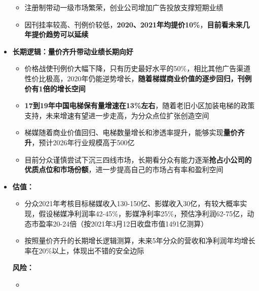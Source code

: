\begin{itemize}[leftmargin=*]
{\begin{itemize}
        \item 注册制带动一级市场繁荣，创业公司增加广告投放支撑短期业绩
        \item 因刊挂率较高、刊例价较低，\textbf{2020、2021年均提价10\%}，\textbf{目前看未来几年提价趋势可以延续}
      \end{itemize}
      }
    \item
      \textbf{长期逻辑：量价齐升带动业绩长期向好}
      {\small
      \begin{itemize}
        \item 价格战使刊例价大幅下降，只有历史最好水平的50\%，相比其他广告渠道性价比极高，2020年仍能逆势增长，\textbf{随着梯媒商业价值的逐步回归，刊例价有1倍的增长空间}
        \item \textbf{17到19年中国电梯保有量增速在13\%左右}，随着老旧小区加装电梯的政策支持，未来增速有望进一步走高，为分众点位扩张创造空间
        \item 梯媒随着商业价值回归、电梯数量增长和渗透率提升，能够实现\textbf{量价齐升}，预计2026年行业规模高于500亿
        \item 目前分众谨慎尝试下沉三四线市场，长期看分众有能力逐渐\textbf{抢占小公司的优质点位和市场份额}，进一步提高自己的市场占有率和盈利空间
      \end{itemize}
      }
      \item
      \textbf{估值：}
      {\small
      \begin{itemize}
        \item 分众2021年考核目标梯媒收入130-150亿、影媒收入30亿，有较大概率实现，假设梯媒净利润率42-45\%，影媒净利率25\%，预估净利润62-75亿，动态市盈率20-24倍（按2021年3月12日收盘市值1491亿测算）
        \item 按照量价齐升的长期增长逻辑测算，未来5年分众的营收和净利润年均增长率在20\%以上，体现出不错的安全边际
      \end{itemize}
      }
      \textbf{风险：}
      {\small
      \begin{itemize}
        \item 
      \end{itemize}
      }
  \end{itemize}